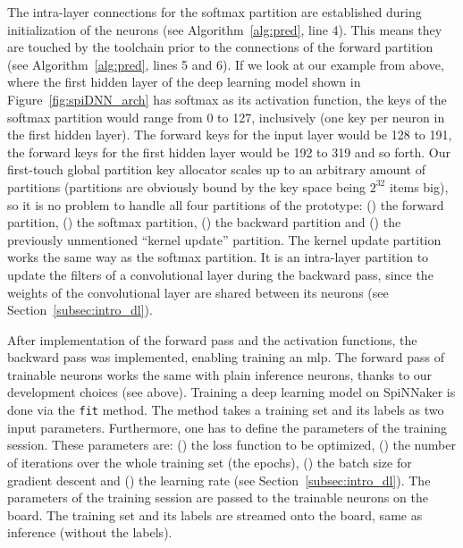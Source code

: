\documentclass[]{article}
\begin{document}
The intra-layer connections for the softmax partition are established
during initialization of the neurons (see Algorithm~\ref{alg:pred},
line 4).
This means they are touched by the toolchain prior to the connections
of the forward partition (see Algorithm~\ref{alg:pred}, lines 5 and
6).
If we look at our example from above, where the first hidden layer
of the deep learning model shown in Figure~\ref{fig:spiDNN_arch} has
softmax as its activation function, the keys of the softmax partition
would range from 0 to 127, inclusively (one key per neuron in the
first hidden layer).
The forward keys for the input layer would be 128 to 191, the
forward keys for the first hidden layer would be 192 to 319 and so
forth.
Our first-touch global partition key allocator scales up to an
arbitrary amount of partitions (partitions are obviously bound by the
key space being $2^{32}$ items big), so it is no problem to handle all
four partitions of the prototype:
() the forward partition, () the
softmax partition, () the backward partition and
() the previously unmentioned ``kernel update''
partition.
The kernel update partition works the same way as the softmax
partition.
It is an intra-layer partition to update the filters of a
convolutional layer during the backward pass, since the weights of
the convolutional layer are shared between its neurons
(see Section~\ref{subsec:intro_dl}).

After implementation of the forward pass and the activation functions,
the backward pass was implemented, enabling training an \acrshort{mlp}.
The forward pass of trainable neurons works the same with plain
inference neurons, thanks to our development choices (see above).
Training a deep learning model on SpiNNaker is done via the
\texttt{fit} method.
The method takes a training set and its labels as two input
parameters.
Furthermore, one has to define the parameters of the training session.
These parameters are: () the loss function to be
optimized, () the number of iterations over the whole
training set (the epochs), () the batch size for
gradient descent and () the learning rate
(see Section~\ref{subsec:intro_dl}).
The parameters of the training session are passed to the trainable
neurons on the board.
The training set and its labels are streamed onto the board, same as
inference (without the labels).
\end{document}
